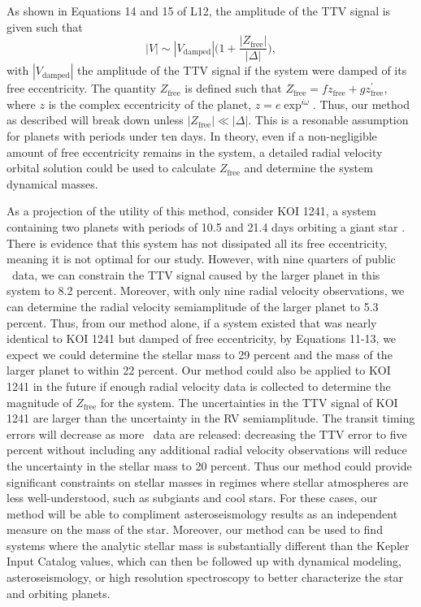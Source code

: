 As shown in Equations 14 and 15 of L12, the amplitude of the TTV signal is given such that
\begin{equation}
|V| \sim |V_\textrm{damped}|\bigg(1 + \frac{|Z_\textrm{free}|}{|\Delta|}\bigg),
\end{equation}
with $|V_\textrm{damped}|$ the amplitude of the TTV signal if the system were damped of its free eccentricity. The quantity $Z_\textrm{free}$ is defined such that $Z_\textrm{free} = f z_\textrm{free} + g z^\prime_\textrm{free}$, where $z$ is the complex eccentricity of the planet, $z = e\exp^{i \omega}$. Thus, our method as described will break down unless $|Z_{\textrm{free}}| \ll |\Delta|$. This is a resonable assumption for planets with periods under ten days. In theory, even if a non-negligible amount of free eccentricity remains in the system, a detailed radial velocity orbital solution could be used to calculate $Z_{\textrm{free}}$ and determine the system dynamical masses.

As a projection of the utility of this method, consider KOI 1241, a system containing two planets with periods of 10.5 and 21.4 days orbiting a giant star \citep[$R = 3.14 R_\odot$,][]{Steffen12b}. There is evidence that this system has not dissipated all its free eccentricity, meaning it is not optimal for our study. However, with nine quarters of public \kep\ data, we can constrain the TTV signal caused by the larger planet in this system to 8.2 percent. Moreover, with only nine radial velocity observations, we can determine the radial velocity semiamplitude of the larger planet to 5.3 percent. Thus, from our method alone, if a system existed that was nearly identical to KOI 1241 but damped of free eccentricity, by Equations 11-13, we expect we could determine the stellar mass to 29 percent and the mass of the larger planet to within 22 percent. Our method could also be applied to KOI 1241 in the future if enough radial velocity data is collected to determine the magnitude of $Z_\textrm{free}$ for the system. The uncertainties in the TTV signal of KOI 1241 are larger than the uncertainty in the RV semiamplitude. The transit timing errors will decrease as more \kep\ data are released: decreasing the TTV error to five percent without including any additional radial velocity observations will reduce the uncertainty in the stellar mass to 20 percent. Thus our method could provide significant constraints on stellar masses in regimes where stellar atmospheres are less well-understood, such as subgiants and cool stars. For these cases, our method will be able to compliment asteroseismology results as an independent measure on the mass of the star. Moreover, our method can be used to find systems where the analytic stellar mass is substantially different than the Kepler Input Catalog values, which can then be followed up with dynamical modeling, asteroseismology, or high resolution spectroscopy to better characterize the star and orbiting planets.

